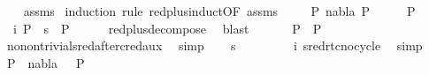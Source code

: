 \begin{isabellebody}
%
\isadelimproof
\ \ %
\endisadelimproof
%
\isatagproof
{}\isamarkupfalse%
\ assms\isanewline
{}\isamarkupfalse%
\ {\isacharparenleft}{\kern0pt}induction\ rule{\isacharcolon}{\kern0pt}\ red{\isacharunderscore}{\kern0pt}plus{\isachardot}{\kern0pt}induct{\isacharbrackleft}{\kern0pt}OF\ assms{\isacharparenleft}{\kern0pt}{}{\isacharparenright}{\kern0pt}{\isacharbrackright}{\kern0pt}{\isacharparenright}{\kern0pt}\isanewline
\ \ \isamarkupfalse%
\ {\isacharparenleft}{\kern0pt}{}\ P{}\ nabla{}\ P{}{\isacharparenright}{\kern0pt}\isanewline
\ \ \isamarkupfalse%
\ \isamarkupfalse%
\ P{\isacharprime}{\kern0pt}\ \isanewline
\ \ i{\isacharcolon}{\kern0pt}\ {\isachardoublequoteopen}P{}\ {\isasymturnstile}\ s{}\ {\isasymleadsto}\isactrlsup {\isacharasterisk}{\kern0pt}\ P{\isacharprime}{\kern0pt}{\isachardoublequoteclose}\isanewline
\ \ \ \ \isamarkupfalse%
\ red{\isacharunderscore}{\kern0pt}plus{\isacharunderscore}{\kern0pt}decompose\ \isamarkupfalse%
\ blast\isanewline
\ \ \isamarkupfalse%
\ {}{\isacharparenleft}{\kern0pt}{}{\isacharparenright}{\kern0pt}\ \isamarkupfalse%
\ {\isachardoublequoteopen}P{}\ {\isacharequal}{\kern0pt}\ P{\isacharprime}{\kern0pt}{\isachardoublequoteclose}\ \isanewline
\ \ \ \isamarkupfalse%
\ no{\isacharunderscore}{\kern0pt}nontrivial{\isacharunderscore}{\kern0pt}sred{\isacharunderscore}{\kern0pt}after{\isacharunderscore}{\kern0pt}cred{\isacharunderscore}{\kern0pt}aux\ \isamarkupfalse%
\ simp\isanewline
\ \ \isamarkupfalse%
\ {\isachardoublequoteopen}s{}\ {\isacharequal}{\kern0pt}\ {\isacharbrackleft}{\kern0pt}{\isacharbrackright}{\kern0pt}{\isachardoublequoteclose}\ \isanewline
\ \ \ \ \isamarkupfalse%
\ i{\isacharparenleft}{\kern0pt}{}{\isacharparenright}{\kern0pt}\ sred{\isacharunderscore}{\kern0pt}rtc{\isacharunderscore}{\kern0pt}no{\isacharunderscore}{\kern0pt}cycle\ \isamarkupfalse%
\ simp\isanewline
\ \ \isamarkupfalse%
\ {\isachardoublequoteopen}P{}\ {\isasymTurnstile}\ {\isacharparenleft}{\kern0pt}nabla{}{\isacharcomma}{\kern0pt}\ {\isacharbrackleft}{\kern0pt}{\isacharbrackright}{\kern0pt}{\isacharparenright}{\kern0pt}\ {\isasymRightarrow}\ P{}{\isachardoublequoteclose}\ \isanewline

\end{isabellebody}
